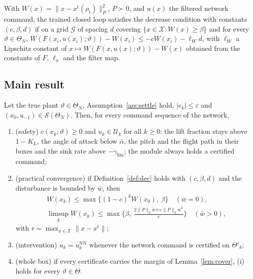 \begin{definition}\label{def:dec}
With $W(x)=\|x-x^{\mathrm t}(\rho_{\mathrm t})\|_P^2$, $P\succ0$, and $u(x)$ the filtered network command, the trained closed loop satisfies the decrease condition with constants $(c,\beta,d)$ if on a grid $\mathcal G$ of spacing $d$ covering $\{x\in\mathcal X:W(x)\ge\beta\}$ and for every $\vartheta\in\Theta_N$, $W(F(x_i,u(x_i);\vartheta))-W(x_i)\le-cW(x_i)-\ell_Wd$, with $\ell_W$ a Lipschitz constant of $x\mapsto W(F(x,u(x);\vartheta))-W(x)$ obtained from the constants of $F$, $\ell_\pi$ and the filter map.
\end{definition}

\subsection{Main result}
\begin{theorem}\label{thm:main}
Let the true plant $\vartheta\in\Theta_N$, Assumption~\ref{ass:settle} hold, $|e_k|\le\varepsilon$ and $(x_0,u_{-1})\in\mathcal S(\Theta_N)$. Then, for every command sequence of the network,
\begin{enumerate}[label=(\roman*),leftmargin=2em]
\item (safety) $c(x_k;\vartheta)\ge0$ and $u_k\in\mathcal U_k$ for all $k\ge0$: the lift fraction stays above $1-K_L$, the angle of attack below $\bar\alpha$, the pitch and the flight path in their boxes and the sink rate above $-\dot\gamma_{\lim}$; the module always holds a certified command;
\item (practical convergence) if Definition~\ref{def:dec} holds with $(c,\beta,d)$ and the disturbance is bounded by $\bar w$, then
\begin{equation}\label{eq:conv}
\begin{aligned}&W(x_k)\le\max\{(1-c)^kW(x_0),\ \beta\}\quad(\bar w=0),\\ &\limsup_{k}W(x_k)\le\max\Big\{\beta,\ \frac{2\|P\|_2\bar w\,\overline r+\|P\|_2\bar w^2}{c}\Big\}\quad(\bar w>0),\end{aligned}
\end{equation}
with $\overline r=\max_{x\in\mathcal X}\|x-x^{\mathrm t}\|$;
\item (intervention) $u_k=u^{\mathrm{NN}}_k$ whenever the network command is certified on $\Theta'_k$;
\item (whole box) if every certificate carries the margin of Lemma~\ref{lem:cover}, (i) holds for every $\vartheta\in\Theta$.
\end{enumerate}
\end{theorem}
